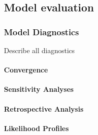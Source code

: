 \documentclass[11pt,
  english,
  a4paper,
]{article}
\begin{document}
\hypertarget{model-evaluation}{%
\subsection{Model evaluation}\label{model-evaluation}}

\leavevmode\tagmcend\tagstructend


\hypertarget{model-diagnostics}{%
\subsubsection{Model Diagnostics}\label{model-diagnostics}}

\leavevmode\tagmcend\tagstructend


Describe all diagnostics

\leavevmode\tagmcend\tagstructend\par


\hypertarget{convergence}{%
\paragraph{Convergence}\label{convergence}}

\leavevmode\tagmcend\tagstructend


\hypertarget{sensitivity-analyses}{%
\paragraph{Sensitivity Analyses}\label{sensitivity-analyses}}

\leavevmode\tagmcend\tagstructend


\hypertarget{retrospective-analysis}{%
\paragraph{Retrospective Analysis}\label{retrospective-analysis}}

\leavevmode\tagmcend\tagstructend


\hypertarget{likelihood-profiles}{%
\paragraph{Likelihood Profiles}\label{likelihood-profiles}}
\end{document}
